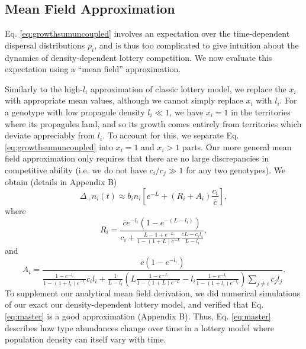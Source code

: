 \documentclass[11pt]{article}
\begin{document}
\subsection*{Mean Field Approximation}

Eq. \eqref{eq:growthsumuncoupled} involves an expectation over the time-dependent dispersal distributions $p_i$, and is thus too complicated to give intuition about the dynamics of density-dependent lottery competition. We now evaluate this expectation using a ``mean field'' approximation. 

Similarly to the high-$l_i$ approximation of classic lottery model, we replace the $x_i$ with appropriate mean values, although we cannot simply replace $x_i$ with $l_i$. For a genotype with low propagule density $l_i\ll 1$, we have $x_i=1$ in the territories where its propagules land, and so its growth comes entirely from territories which deviate appreciably from $l_i$. To account for this, we separate Eq. \eqref{eq:growthsumuncoupled} into $x_i=1$ and $x_i>1$ parts. Our more general mean field approximation only requires that there are no large discrepancies in competitive ability (i.e. we do not have $c_i/c_j\gg 1$ for any two genotypes). We obtain (details in Appendix B)
\begin{equation}
\Delta_+ n_i(t)\approx b_i n_i\left[e^{-L}+(R_i+A_i)\frac{c_i}{\overline{c}}\right], \label{eq:master}
\end{equation}
where
\begin{equation}
R_i=\frac{\overline{c}e^{-l_i}(1-e^{-(L-l_i)})}{c_i +\frac{L-1+e^{-L}}{1-(1+L)e^{-L}}\frac{\overline{c}L- c_il_i}{L-l_i}},\label{eq:Dr}
\end{equation}
and
\begin{equation}
A_i=\frac{\overline{c}(1-e^{-l_i})}{\frac{1-e^{-l_i}}{1-(1+l_i)e^{-l_i}}c_il_i+\frac{1}{L-l_i}\left(L\frac{1-e^{-L}}{1-(1+L)e^{-L}}-l_i\frac{1-e^{-l_i}}{1-(1+l_i)e^{-l_i}}\right)\sum_{j\neq i}c_jl_j}.\label{eq:Da}
\end{equation}
To supplement our analytical mean field derivation, we did numerical simulations of our exact our density-dependent lottery model, and verified  that Eq. \eqref{eq:master} is a good approximation (Appendix B). Thus, Eq. \eqref{eq:master} describes how type abundances change over time in a lottery model where population density can itself vary with time.
\end{document}
